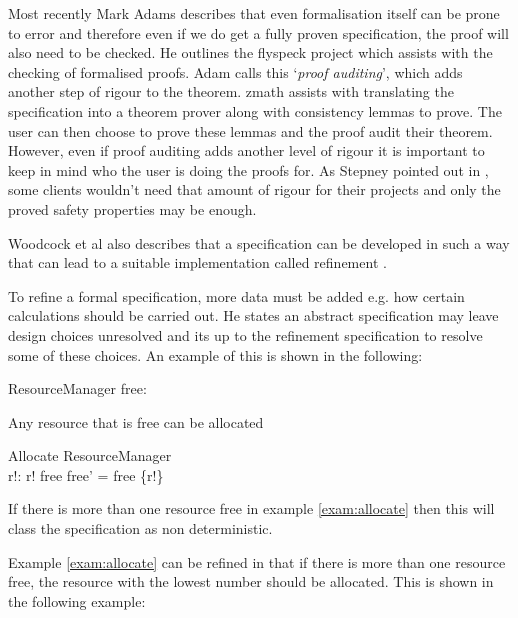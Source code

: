 Most recently Mark Adams \cite{JFR4576} describes that even formalisation itself
can be prone to error and therefore even if we do get a fully proven
specification, the proof will also need to be checked. He outlines the flyspeck
project which assists with the checking of formalised proofs. Adam calls this
`\emph{proof auditing}', which adds another step of rigour to the theorem.
\gls{zmath} assists with translating the specification into a theorem prover
along with consistency lemmas to prove. The user can then choose to prove these
lemmas and the proof audit their theorem. However, even if proof auditing adds
another level of rigour it is important to keep in mind who the user is doing
the proofs for. As Stepney pointed out in \cite{stepney1998tale}, some clients
wouldn't need that amount of rigour for their projects and only the proved
safety properties may be enough.

Woodcock et al also describes that a specification can be developed in such a
way that can lead to a suitable implementation called refinement
\cite{Woodcock:1996:UZS:235337}. 

To refine a formal specification, more data must be added e.g. how certain
calculations should be carried out. He states an abstract specification may
leave design choices unresolved and its up to the refinement specification to
resolve some of these choices. An example of this is shown in the following:

\begin{exam}

\begin{schema}{ResourceManager}
free:  \nat
\end{schema}

 Any resource that is free can be allocated

\begin{schema}{Allocate}
\Delta ResourceManager \\
r!: \nat
\where
r! \in free \land free' = free \setminus \{r!\}
\end{schema}

\label{exam:allocate} 
\end{exam}

If there is more than one resource free in example \ref{exam:allocate} then this
will class the specification as non deterministic.

Example \ref{exam:allocate} can be refined in that if there is more than one
resource free, the resource with the lowest number should be allocated. This is
shown in the following example:


